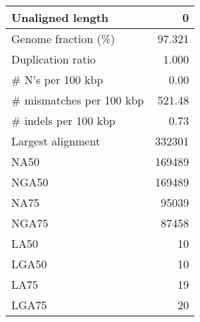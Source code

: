 \documentclass[12pt,a4paper]{article}
\begin{document}
\begin{table}[ht]
\begin{center}
\begin{tabular}{|l*{1}{|r}|}
Unaligned length & 0 \\ \hline
Genome fraction (\%) & 97.321 \\ \hline
Duplication ratio & 1.000 \\ \hline
\# N's per 100 kbp & 0.00 \\ \hline
\# mismatches per 100 kbp & 521.48 \\ \hline
\# indels per 100 kbp & 0.73 \\ \hline
Largest alignment & 332301 \\ \hline
NA50 & 169489 \\ \hline
NGA50 & 169489 \\ \hline
NA75 & 95039 \\ \hline
NGA75 & 87458 \\ \hline
LA50 & 10 \\ \hline
LGA50 & 10 \\ \hline
LA75 & 19 \\ \hline
LGA75 & 20 \\ \hline
\end{tabular}
\end{center}
\end{table}
\end{document}
